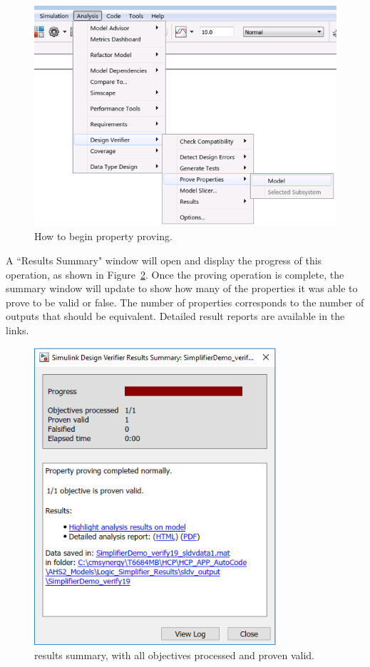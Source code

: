 \documentclass{article}
\begin{document}
\begin{figure}[!htb]
  \centering
	\includegraphics[width=.9\textwidth]{../figs/StartProve}
	\caption{How to begin property proving.}
	\label{FIG:ProveStart}
\end{figure}

A ``\SDV Results Summary" window will open and display the progress of this operation, as shown in Figure~\ref{FIG:demo4}. Once the proving operation is complete, the summary window will update to show how many of the properties it was able to prove to be valid or false. The number of properties corresponds to the number of outputs that should be equivalent. Detailed result reports are available in the links.

\begin{figure}[!htb]
  \centering
	\includegraphics[width=0.8\textwidth]{../figs/VerificationResults}
	\caption{\SDV results summary, with all objectives processed and proven valid.}
	\label{FIG:demo4}
\end{figure}
\end{document}
